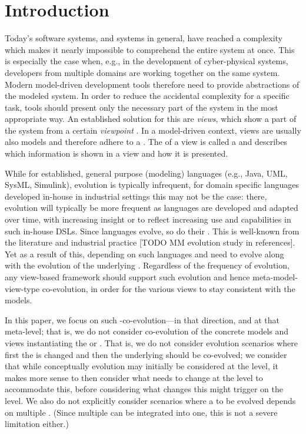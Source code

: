 \section{Introduction}
\label{sec:Introduction}

Today's software systems, and systems in general, have reached a complexity which makes it nearly impossible to comprehend the entire system at once.
This is especially the case when, e.g., in the development of cyber-physical systems, developers from multiple domains are working together on the same system.
Modern model-driven development tools therefore need to provide abstractions of the modeled system.
In order to reduce the accidental complexity for a specific task, tools should present only the necessary part of the system in the most appropriate way.
An established solution for this are \emph{views}, which show a part of the system from a certain \emph{viewpoint} \autocite{atkinson_orthographic_2010}.
In a model-driven context, views are usually also models and therefore adhere to a \metamodel.
The \metamodel of a view is called a \viewtype \autocite{goldschmidt_towards_2012} and describes which information is shown in a view and how it is presented.

While for established, general purpose (modeling) languages (e.g., Java, UML, SysML, Simulink), evolution is typically infrequent, for domain specific languages developed in-house in industrial settings this may not be the case: there, evolution will typically be more frequent as languages are developed and adapted over time, with increasing insight or to reflect increasing use and capabilities in such in-house DSLs. Since languages evolve, so do their \metamodels. This is well-known from the literature and industrial practice [TODO MM evolution study in references]. Yet as a result of this, \viewtypes depending on such languages and \metamodels need to evolve along with the evolution of the underlying \metamodels. Regardless of the frequency of \metamodel evolution, any view-based framework should support such evolution and hence meta-model-view-type co-evolution, in order for the various views to stay consistent with the models. 

In this paper, we focus on such \metamodel-\viewtype co-evolution---in that direction, and at that meta-level; that is, we do not consider co-evolution of the concrete models and views instantiating the \metamodel or \viewtype. That is, we do not consider evolution scenarios where first the \viewtype is changed and then the underlying \metamodel should be co-evolved; we consider that while conceptually evolution may initially be considered at the \viewtype level, it makes more sense to then consider what needs to change at the \metamodel level to accommodate this, before considering what changes this might trigger on the \viewtype level. We also do not explicitly consider scenarios where a \viewtype to be evolved depends on multiple \metamodels. (Since multiple \metamodels can be integrated into one, this is not a severe limitation either.)

